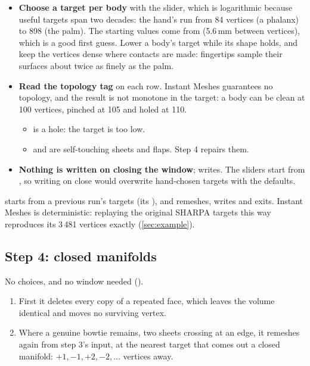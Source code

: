 \begin{itemize}
\item \textbf{Choose a target per body} with the slider, which is logarithmic because useful targets span two decades: the hand's run from 84 vertices (a phalanx) to 898 (the palm). The starting values come from  (5.6\,mm between vertices), which is a good first guess. Lower a body's target while its shape holds, and keep the vertices dense where contacts are made: fingertips sample their surfaces about twice as finely as the palm.
\item \textbf{Read the topology tag} on each row. Instant Meshes guarantees no topology, and the result is not monotone in the target: a body can be clean at 100 vertices, pinched at 105 and holed at 110.
  \begin{itemize}
  \item {} is a hole: the target is too low.
  \item {} and  are self-touching sheets and flaps. Step 4 repairs them.
  \end{itemize}
\item \textbf{Nothing is written on closing the window};  writes. The sliders start from , so writing on close would overwrite hand-chosen targets with the defaults.
\end{itemize}

 starts from a previous run's targets (its ), and  remeshes, writes and exits. Instant Meshes is deterministic: replaying the original SHARPA targets this way reproduces its 3\,481 vertices exactly (\cref{sec:example}).

\subsection{Step 4: closed manifolds}\label{sec:step4}

No choices, and no window needed ().

\begin{enumerate}
\item First it deletes every copy of a repeated face, which leaves the volume identical and moves no surviving vertex.
\item Where a genuine bowtie remains, two sheets crossing at an edge, it remeshes again from step 3's input, at the nearest target that comes out a closed manifold: $+1, -1, +2, -2, \ldots$ vertices away.
\end{enumerate}

